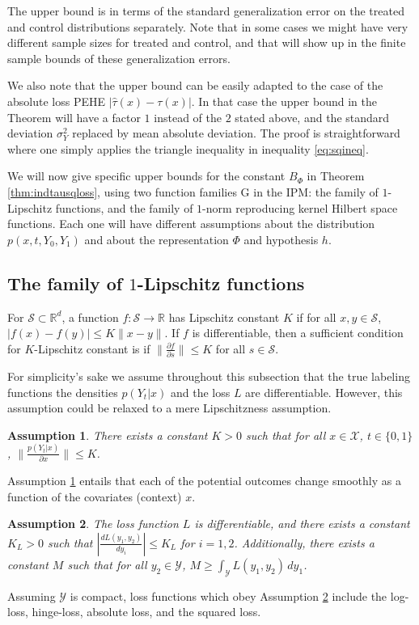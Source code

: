 \documentclass{article}
\newtheorem{thmappasmp}{Assumption}
\def\cX{\mathcal X}
\def\cY{\mathcal Y}
\def\cS{\mathcal S}
\def\cF{\mathrm{G}}
\def \R{\mathbb{R}}
\begin{document}
The upper bound is in terms of the standard generalization error on the treated and control distributions separately. Note that in some cases we might have very different sample sizes for treated and control, and that will show up in the finite sample bounds of these generalization errors.

We also note that the upper bound can be easily adapted to the case of the absolute loss PEHE $\left| \hat{\tau}(x) - \tau(x)\right|$. In that case the upper bound in the Theorem will have a factor $1$ instead of the $2$ stated above, and the standard deviation $\sigma^2_Y$ replaced by mean absolute deviation. The proof is straightforward where one simply applies the triangle inequality in inequality \eqref{eq:sqineq}.


We will now give specific upper bounds for the constant $B_\Phi$ in Theorem \ref{thm:indtausqloss}, using two function families $\cF$ in the IPM: the family of $1$-Lipschitz functions, and the family of $1$-norm reproducing kernel Hilbert space functions. Each one will have different assumptions about the distribution $p(x,t,Y_0,Y_1)$ and about the representation $\Phi$ and hypothesis $h$.

\subsection{The family of $1$-Lipschitz functions}\label{subsec:wass}

For $\cS \subset \R^d$, a function $f : \cS \rightarrow \R$ has Lipschitz constant $K$ if for all $x,y \in \cS$, $|f(x) - f(y)| \leq K\|x-y\|$. If $f$ is differentiable, then a sufficient condition for $K$-Lipschitz constant is if $\| \frac{\partial f}{\partial s} \| \leq K$ for all $s\in \cS$.

For simplicity's sake we assume throughout this subsection that the true labeling functions the densities $p(Y_t|x)$ and the loss $L$ are differentiable. However, this assumption could be relaxed to a mere Lipschitzness assumption.
\begin{thmappasmp}\label{assmp_f_lip}
There exists a constant $K >0$ such that for all $x \in \cX$, $t \in \{0,1\}$, $\| \frac{p(Y_t|x)}{\partial x} \| \leq K$.
\end{thmappasmp}
Assumption \ref{assmp_f_lip} entails that each of the potential outcomes change smoothly as a function of the covariates (context) $x$.

\begin{thmappasmp}\label{asmp:loss}
The loss function $L$ is differentiable, and there exists a constant $K_L >0$ such that $\left|\frac{d L(y_1,y_2)}{d y_i}\right| \leq K_L$ for $i=1,2$. Additionally, there exists a constant $M$ such that for all $y_2\in \cY$, $M \geq \int_{\cY} L(y_1,y_2)\, dy_1$.
\end{thmappasmp}
Assuming $\cY$ is compact, loss functions which obey Assumption \ref{asmp:loss} include the log-loss, hinge-loss, absolute loss, and the squared loss.
\end{document}
